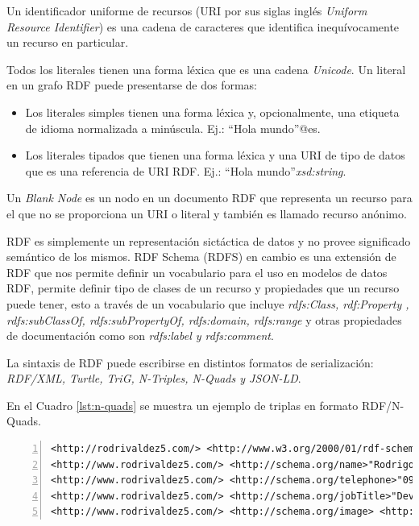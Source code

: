 Un identificador uniforme de recursos (URI por sus siglas inglés \textit{Uniform Resource Identifier}) es una cadena de caracteres que identifica inequívocamente un recurso en particular. 

Todos los literales tienen una forma léxica que es una cadena \textit{Unicode}. Un literal en un grafo RDF puede presentarse de dos formas:
\begin{itemize}
    \item Los literales simples tienen una forma léxica y, opcionalmente, una etiqueta de idioma normalizada a minúscula. Ej.: “Hola mundo”@es.
    \item Los literales tipados que tienen una forma léxica y una URI de tipo de datos que es una referencia de URI RDF. Ej.: “Hola mundo”\textit{xsd:string}.
\end{itemize}

Un \textit{Blank Node} es un nodo en un documento RDF que representa un recurso para el que no se proporciona un URI o literal y también es llamado recurso anónimo.

RDF es simplemente un representación sictáctica de datos y no provee significado semántico de los mismos. RDF Schema (RDFS) en cambio es una extensión de RDF que nos permite definir un vocabulario para el uso en modelos de datos RDF, permite definir tipo de clases de un recurso y propiedades que un recurso puede tener, esto a través de un vocabulario que incluye\textit{ rdfs:Class, rdf:Property , rdfs:subClassOf, rdfs:subPropertyOf, rdfs:domain, rdfs:range} y otras propiedades de documentación como son \textit{rdfs:label y rdfs:comment}.

La sintaxis de RDF puede escribirse en distintos formatos de serialización: \textit{RDF/XML, Turtle, TriG, N-Triples, N-Quads y JSON-LD}.

En el Cuadro \ref{lst:n-quads} se muestra un ejemplo de triplas en formato RDF/N-Quads. \hfill \break

\lstset{language=XML}
    
\noindent\begin{minipage}{\textwidth}
\begin{lstlisting}[captionpos=b, caption=Ejemplo en RDF/N-Quads, label=lst:n-quads,  numbers=left,  numberstyle=\tiny\color{mygray},frame=single]
<http://rodrivaldez5.com/> <http://www.w3.org/2000/01/rdf-schema#type> <http://schema.org/person> .  
<http://www.rodrivaldez5.com/> <http://schema.org/name>"Rodrigo Valdez" .
<http://www.rodrivaldez5.com/> <http://schema.org/telephone>"0981530572" .
<http://www.rodrivaldez5.com/> <http://schema.org/jobTitle>"Developer" .
<http://www.rodrivaldez5.com/> <http://schema.org/image> <http://www.rodrivaldez5.com/images/rodri.png> .
\end{lstlisting}
\end{minipage}

